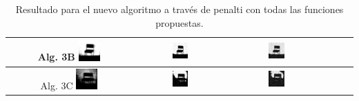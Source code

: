 \begin{table}
\centering
\begin{tabular}{cccccc}\hline
Alg. 3B\quad
\includegraphics[width=0.18\textwidth]{img/res/e3a/alg3btipo-chairga.jpg} &
\includegraphics[width=0.18\textwidth]{img/res/e3a/alg3btipo-chairsp005.jpg} &
\includegraphics[width=0.18\textwidth]{img/res/e3a/alg3btipo-chairsp020.jpg}\\\hline
Alg. 3C\quad     
\includegraphics[width=0.18\textwidth]{img/res/e3a/alg3ctipo-chairga.jpg} &
\includegraphics[width=0.18\textwidth]{img/res/e3a/alg3ctipo-chairsp005.jpg} &
\includegraphics[width=0.18\textwidth]{img/res/e3a/alg3ctipo-chairsp020.jpg}\\\hline
\end{tabular}
\caption{Resultado para el nuevo algoritmo a través de penalti con todas las funciones propuestas.\label{tab:resultexp3imagenesdombi}}
\end{table}


